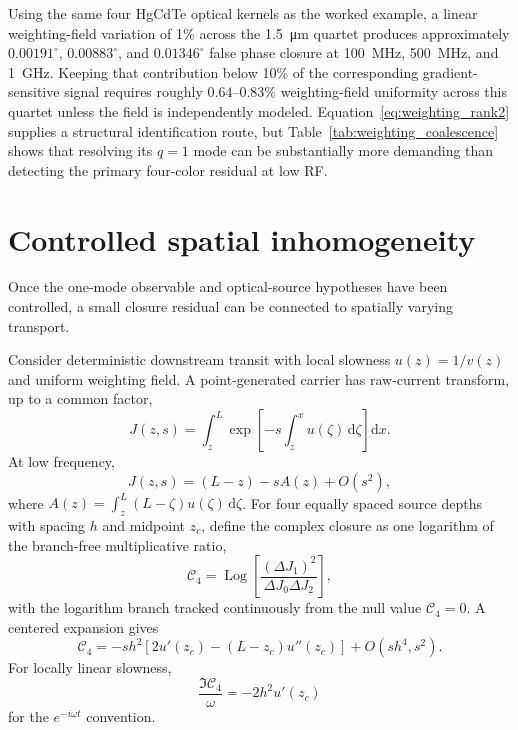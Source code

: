 \documentclass[11pt]{article}
\newcommand{\Cfour}{\mathcal{C}_4}
\newcommand{\dd}{\mathrm{d}}
\begin{document}
Using the same four HgCdTe optical kernels as the worked example, a linear weighting-field variation of 1\% across the \SI{1.5}{\micro\meter} quartet produces approximately $0.00191^\circ$, $0.00883^\circ$, and $0.01346^\circ$ false phase closure at \SI{100}{MHz}, \SI{500}{MHz}, and \SI{1}{GHz}. Keeping that contribution below 10\% of the corresponding gradient-sensitive signal requires roughly $0.64$--$0.83$\% weighting-field uniformity across this quartet unless the field is independently modeled. Equation~\eqref{eq:weighting_rank2} supplies a structural identification route, but Table~\ref{tab:weighting_coalescence} shows that resolving its $q=1$ mode can be substantially more demanding than detecting the primary four-color residual at low RF.

\section{Controlled spatial inhomogeneity}

Once the one-mode observable and optical-source hypotheses have been controlled, a small closure residual can be connected to spatially varying transport.

Consider deterministic downstream transit with local slowness $u(z)=1/v(z)$ and uniform weighting field. A point-generated carrier has raw-current transform, up to a common factor,
\begin{equation}
J(z,s)=\int_z^L
\exp\left[-s\int_z^x u(\zeta)\,\dd \zeta\right]\dd x.
\label{eq:Jvarying}
\end{equation}
At low frequency,
\begin{equation}
J(z,s)=(L-z)-sA(z)+O(s^2),
\end{equation}
where $A(z)=\int_z^L(L-\zeta)u(\zeta)\,\dd \zeta$. For four equally spaced source depths with spacing $h$ and midpoint $z_c$, define the complex closure as one logarithm of the branch-free multiplicative ratio,
\begin{equation}
\boxed{
\Cfour=\operatorname{Log}\!\left[\frac{(\Delta J_1)^2}{\Delta J_0\Delta J_2}\right],}
\label{eq:C4_logratio}
\end{equation}
with the logarithm branch tracked continuously from the null value $\Cfour=0$. A centered expansion gives
\begin{equation}
\boxed{
\Cfour=-s h^2\left[2u'(z_c)-(L-z_c)u''(z_c)\right]
+O(sh^4,s^2).}
\label{eq:gradienttheorem}
\end{equation}
For locally linear slowness,
\begin{equation}
\boxed{
\frac{\Im\Cfour}{\omega}=-2h^2u'(z_c)}
\label{eq:linearq}
\end{equation}
for the $e^{-i\omega t}$ convention.
\end{document}
